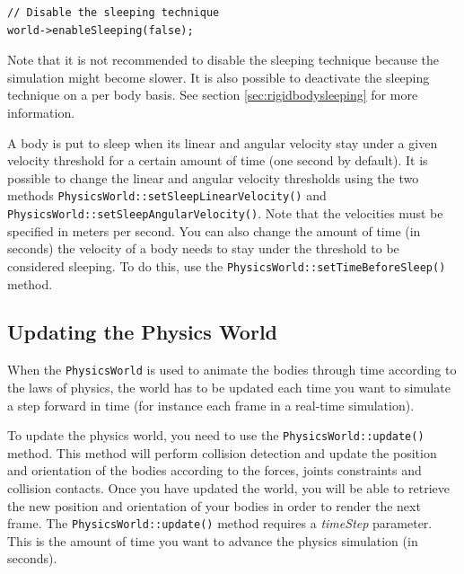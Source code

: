 \documentclass[a4paper,12pt]{article}
\begin{document}
    \begin{lstlisting}
// Disable the sleeping technique
world->enableSleeping(false);
  \end{lstlisting}

    \vspace{0.6cm}

    Note that it is not recommended to disable the sleeping technique because the simulation might become slower. It is also possible to deactivate
    the sleeping technique on a per body basis. See section \ref{sec:rigidbodysleeping} for more information. \\

    \begin{sloppypar}
      A body is put to sleep when its linear and angular velocity stay under a given velocity threshold for a certain amount of time
      (one second by default). It is possible to change the linear and angular velocity thresholds using the two methods
      \texttt{PhysicsWorld::setSleepLinearVelocity()} and \texttt{PhysicsWorld::setSleepAngularVelocity()}.  Note that the velocities must
      be specified in meters per second. You can also change the amount of time (in seconds) the velocity of a body needs to stay under the
      threshold to be considered sleeping. To do this, use the \texttt{PhysicsWorld::setTimeBeforeSleep()} method.
   \end{sloppypar}

    \subsection{Updating the Physics World}
    \label{sec:updatingphysicsworld} 

    When the \texttt{PhysicsWorld} is used to animate the bodies through time according to the laws of physics, the world has to be updated each time you
    want to simulate a step forward in time (for instance each frame in a real-time simulation). \\

   \begin{sloppypar}
    To update the physics world, you need to use the \texttt{PhysicsWorld::update()} method. This method will perform collision detection and update the
    position and orientation of the bodies according to the forces, joints constraints and collision contacts. Once you have updated the world, you will be
    able to retrieve the new position and orientation of your bodies in order to render the next frame. The \texttt{PhysicsWorld::update()} method
    requires a \emph{timeStep} parameter. This is the amount of time you want to advance the physics simulation (in seconds). \\
   \end{sloppypar}
\end{document}
